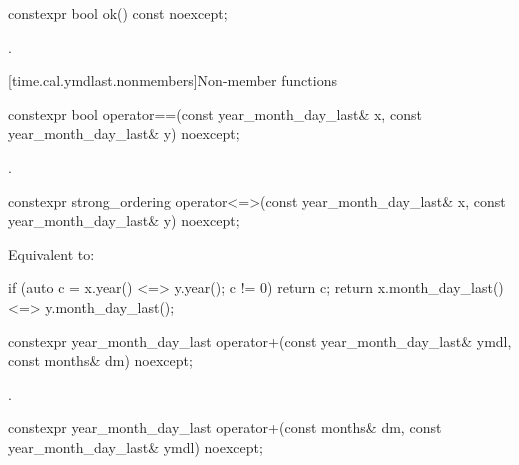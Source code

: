 %
\begin{itemdecl}
constexpr bool ok() const noexcept;
\end{itemdecl}

\begin{itemdescr}
\pnum
\returns
{}.
\end{itemdescr}

[time.cal.ymdlast.nonmembers]{Non-member functions}

%
\begin{itemdecl}
constexpr bool operator==(const year_month_day_last& x, const year_month_day_last& y) noexcept;
\end{itemdecl}

\begin{itemdescr}
\pnum
\returns
{}.
\end{itemdescr}

%
\begin{itemdecl}
constexpr strong_ordering operator<=>(const year_month_day_last& x,
                                      const year_month_day_last& y) noexcept;
\end{itemdecl}

\begin{itemdescr}
\pnum
\effects
Equivalent to:
\begin{codeblock}
if (auto c = x.year() <=> y.year(); c != 0) return c;
return x.month_day_last() <=> y.month_day_last();
\end{codeblock}
\end{itemdescr}

%
\begin{itemdecl}
constexpr year_month_day_last
  operator+(const year_month_day_last& ymdl, const months& dm) noexcept;
\end{itemdecl}

\begin{itemdescr}
\pnum
\returns
{}.
\end{itemdescr}

%
\begin{itemdecl}
constexpr year_month_day_last
  operator+(const months& dm, const year_month_day_last& ymdl) noexcept;
\end{itemdecl}

